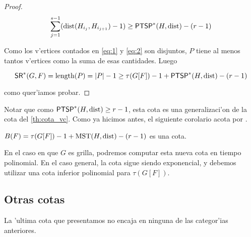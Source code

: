 \begin{theorem}
\begin{proof}
\begin{equation}
\label{eq:2}
\sum_{j = 1}^{s - 1} (\textnormal{dist}(H_{i_j}, H_{i_{j + 1}}) - 1) \geq \textnormal{\textsf{PTSP}}^*(H, \textnormal{dist}) - (r - 1)
\end{equation}

Como los v'ertices contados en \eqref{eq:1} y \eqref{eq:2} son disjuntos, $P$ tiene al menos tantos v'ertices como la suma de esas cantidades. Luego

\[\textnormal{\textsf{SR}}^*(G, F) = \textnormal{length}(P) = |P| - 1 \geq \tau(G[F]) - 1 + \textnormal{\textsf{PTSP}}^*(H, \textnormal{dist}) - (r - 1)\]

\noindent
como quer'iamos probar.

\end{proof}
\end{theorem}

Notar que como $\textnormal{\textsf{PTSP}}^*(H, \textnormal{dist}) \geq r - 1$, esta cota es una generalizaci'on de la cota del \autoref{th:cota_vc}. Como ya hicimos antes, el siguiente corolario acota  por \mst.

\begin{corollary}
\label{co:cota_vc_mst}
$B(F) = \tau(G[F]) - 1 + \textnormal{MST}(H, \textnormal{dist}) - (r - 1)$ es una cota.
\end{corollary}

En el caso en que $G$ es grilla, podremos computar esta nueva cota en tiempo polinomial. En el caso general, la cota sigue siendo exponencial, y debemos utilizar una cota inferior polinomial para $\tau(G[F])$.

\subsection{Otras cotas}

La 'ultima cota que presentamos no encaja en ninguna de las categor'ias anteriores.

